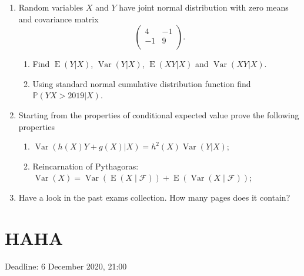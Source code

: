 \documentclass[12pt]{article}
\DeclareMathOperator{\Var}{Var}
\DeclareMathOperator{\E}{E}
\def \cF{\mathcal{F}}
\def \P{\mathbb{P}}
\begin{document}
\begin{enumerate}

\item Random variables $X$ and $Y$ have joint normal distribution with zero means and covariance matrix
\[
\begin{pmatrix}
4 & -1 \\
-1 & 9 \\
\end{pmatrix}.
\]

\begin{enumerate}
  \item Find $\E(Y|X)$, $\Var(Y|X)$, $\E(XY|X)$ and $\Var(XY|X)$.
  \item Using standard normal cumulative distribution function find $\P(YX > 2019 | X)$.
\end{enumerate}

\item Starting from the properties of conditional expected value prove the following properties

\begin{enumerate}
  \item $\Var(h(X)Y + g(X)|X) = h^2(X)\Var(Y|X)$;
  \item Reincarnation of Pythagoras: $\Var(X) = \Var(\E(X \mid \cF)) + \E(\Var(X \mid \cF))$;
\end{enumerate}



\item Have a look in the past exams collection. How many pages does it contain?


\end{enumerate}



\newpage
\section{HAHA}


Deadline: 6 December 2020, 21:00
\end{document}
